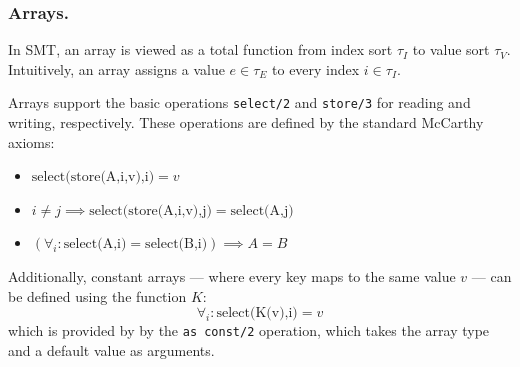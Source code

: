 \subsubsection{Arrays.}
In SMT, an array is viewed as a total function from index sort $\tau_I$ to value sort $\tau_V$.
Intuitively, an array assigns a value $e \in \tau_E$ to every index $i \in \tau_I$.

Arrays support the basic operations \texttt{select/2} and \texttt{store/3} for reading and writing, respectively.
These operations are defined by the standard McCarthy axioms:
\begin{itemize}
\item $\text{select(store(A,i,v),i)} = v$
\item $i \neq j \implies \text{select(store(A,i,v),j)} = \text{select(A,j)}$
\item $(\forall_i: \text{select(A,i)} = \text{select(B,i)}) \implies A = B$
\end{itemize}
Additionally, constant arrays — where every key maps to the same value $v$ — can be defined using the function $K$:
$$\forall_i: \text{select(K(v),i)} = v$$
which is provided by \ziii by the \texttt{as const/2} operation, which takes the array type and a default value as arguments.

